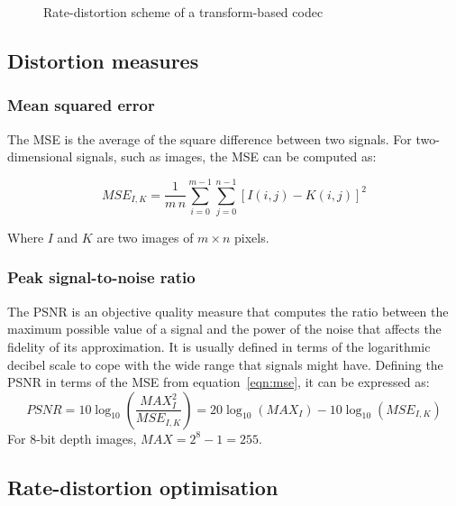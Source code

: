 \documentclass[11pt,a4paper,openright,twoside]{book}
\numberwithin{equation}{section} %
\begin{document}
\begin{figure}[tb]
	\centering
	
	\caption{Rate-distortion scheme of a transform-based codec}
	\label{fig:rate_distortion_scheme}
\end{figure}

\subsection{Distortion measures}
\label{sub:distortion_measures}

\subsubsection{Mean squared error}
\label{ssub:mean_squared_error}

The \ac{MSE} is the average of the square difference between two
signals.
For two-dimensional signals, such as images, the \ac{MSE} can be computed as:

\begin{equation}
	MSE_{I,K} = \frac{1}{m\,n} \sum\limits_{i=0}^{m-1} \sum\limits_{j=0}^{n-1}
	{\left[ I(i,j) - K(i,j) \right]} ^2
	\label{eqn:mse}
\end{equation}

Where $I$ and $K$ are two images of $m \times n$ pixels.

\subsubsection{Peak signal-to-noise ratio}
\label{ssub:peak_signal_to_noise_ratio}

The \ac{PSNR} is an objective quality measure that computes the ratio
between the maximum possible value of a signal and the power of the
noise that affects the fidelity of its approximation.
It is usually defined in terms of the logarithmic decibel scale to cope
with the wide range that signals might have.
Defining the \ac{PSNR} in terms of the \ac{MSE} from
equation~\ref{eqn:mse}, it can be expressed as:
\begin{equation}
	PSNR = 10 \log_{10} \left(\frac{MAX_I^2}{MSE_{I,K}}\right)
	= 20 \log_{10} (MAX_I) - 10 \log_{10} (MSE_{I,K})
	\label{eqn:psnr}
\end{equation}
For 8-bit depth images, $MAX = 2^{8} - 1 = 255$.

\subsection{Rate-distortion optimisation}
\label{sub:rate_distortion_optimisation}
\end{document}
